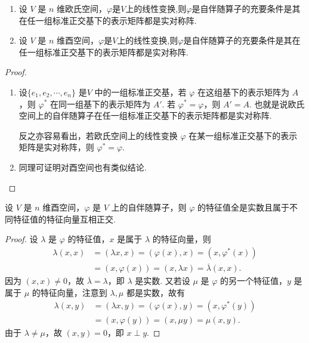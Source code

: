 \documentclass[../../main.tex]{subfiles}
\begin{document}
\begin{theorem}\label{theorem:内积空间的自伴随算子关于表示矩阵的充要条件}
\begin{enumerate}
\item 设 $V$ 是 $n$ 维欧氏空间，$\varphi$是$V$上的线性变换,则$\varphi$是自伴随算子的充要条件是其在任一组标准正交基下的表示矩阵都是实对称阵.

\item 设 $V$ 是 $n$ 维酉空间，$\varphi$是$V$上的线性变换,则$\varphi$是自伴随算子的充要条件是其在任一组标准正交基下的表示矩阵都是实对称阵. 
\end{enumerate}
\end{theorem}
\begin{proof}
\begin{enumerate}
\item 设$\{e_1,e_2,\cdots,e_n\}$ 是$V$ 中的一组标准正交基，若 $\varphi$ 在这组基下的表示矩阵为 $A$，则 $\varphi^*$ 在同一组基下的表示矩阵为 $A'$. 若 $\varphi^* = \varphi$，则 $A' = A$. 也就是说欧氏空间上的自伴随算子在任一组标准正交基下的表示矩阵都是实对称阵.

反之亦容易看出，若欧氏空间上的线性变换 $\varphi$ 在某一组标准正交基下的表示矩阵是实对称阵，则 $\varphi^* = \varphi$.

\item 同理可证明对酉空间也有类似结论. 
\end{enumerate}
\end{proof}

\begin{theorem}\label{theorem:Hermite算子关于特征值的相关性质}
设 $V$ 是 $n$ 维酉空间，$\varphi$ 是 $V$ 上的自伴随算子，则 $\varphi$ 的特征值全是实数且属于不同特征值的特征向量互相正交.
\end{theorem}
\begin{proof}
设 $\lambda$ 是 $\varphi$ 的特征值，$x$ 是属于 $\lambda$ 的特征向量，则
\begin{align*}
\lambda(x,x) &= (\lambda x,x) = (\varphi(x),x) = (x,\varphi^*(x))\\
&= (x,\varphi(x)) = (x,\lambda x) = \overline{\lambda}(x,x).
\end{align*}
因为 $(x,x) \neq 0$，故 $\overline{\lambda} = \lambda$，即 $\lambda$ 是实数. 又若设 $\mu$ 是 $\varphi$ 的另一个特征值，$y$ 是属于 $\mu$ 的特征向量，注意到 $\lambda,\mu$ 都是实数，故有
\begin{align*}
\lambda(x,y) &= (\lambda x,y) = (\varphi(x),y) = (x,\varphi^*(y))\\
&= (x,\varphi(y)) = (x,\mu y) = \mu(x,y).
\end{align*}
由于 $\lambda \neq \mu$，故 $(x,y) = 0$，即 $x \perp y$.
\end{proof}
\end{document}
